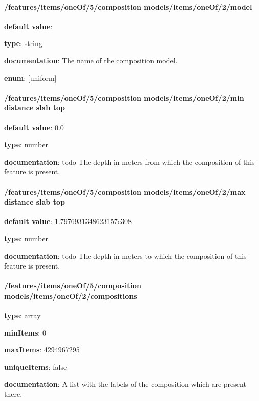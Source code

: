 \paragraph{/features/items/oneOf/5/composition models/items/oneOf/2/model} \begin{itemized}
\item {\bf default value}: 
\item {\bf type}: string
\item {\bf documentation}: The name of the composition model.
\item {\bf enum}: [uniform]\end{itemized}\paragraph{/features/items/oneOf/5/composition models/items/oneOf/2/min distance slab top} \begin{itemized}
\item {\bf default value}: 0.0
\item {\bf type}: number
\item {\bf documentation}: todo The depth in meters from which the composition of this feature is present.
\end{itemized}\paragraph{/features/items/oneOf/5/composition models/items/oneOf/2/max distance slab top} \begin{itemized}
\item {\bf default value}: 1.7976931348623157e308
\item {\bf type}: number
\item {\bf documentation}: todo The depth in meters to which the composition of this feature is present.
\end{itemized}\paragraph{/features/items/oneOf/5/composition models/items/oneOf/2/compositions} \begin{itemized}
\item {\bf type}: array
\item {\bf minItems}: 0
\item {\bf maxItems}: 4294967295
\item {\bf uniqueItems}: false
\item {\bf documentation}: A list with the labels of the composition which are present there.

\end{itemized}

